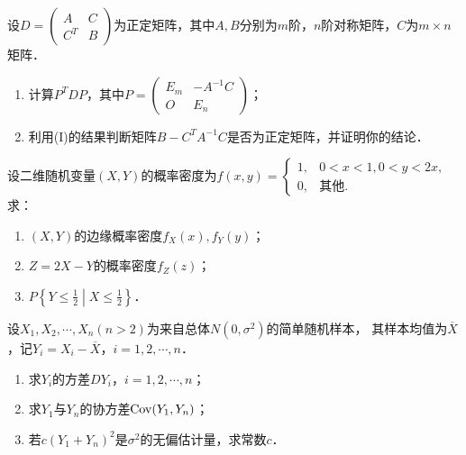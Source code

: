 \documentclass[plain,noanswer,medmath]{../../template/jnuexam}
\begin{document}
\begin{problem}[points=13]
设$D = \begin{pmatrix}
    A & C \\
  C^T & B
\end{pmatrix}$为正定矩阵，其中$A,B$分别为$m$阶，$n$阶对称矩阵，$C$为$m \times n$矩阵．
\begin{enumerate}
\item 计算$P^T DP$，其中$P = \begin{pmatrix}
  E_m & -A^{-1} C \\
    O & E_n
\end{pmatrix}$；
\item 利用(I)的结果判断矩阵$B - C^T A^{-1} C$是否为正定矩阵，并证明你的结论．
\end{enumerate}
\end{problem}


\begin{problem}[points=13]
设二维随机变量$(X,Y)$的概率密度为$f(x,y) = \begin{cases}
  1, & 0 < x < 1,0 < y < 2x, \\
  0, & \text{其他}.
\end{cases}$求：
\begin{enumerate}
\item $(X,Y)$的边缘概率密度$f_X(x),f_Y(y)$；
\item $Z = 2X - Y$的概率密度$f_Z(z)$；
\item $P\left\{Y \le \frac{1}{2} \middle| X \le \frac{1}{2} \right\}$．
\end{enumerate}
\end{problem}


\begin{problem}[points=13]
设$X_1,X_2, \cdots ,X_n(n > 2)$为来自总体$N(0,\sigma^2)$的简单随机样本，
其样本均值为$\overline{X}$，记$Y_i = X_i - \overline{X}$，$i = 1,2, \cdots ,n$．
\begin{enumerate}
\item 求$Y_i$的方差$DY_i$，$i = 1,2, \cdots ,n$；
\item 求$Y_1$与$Y_n$的协方差$\operatorname{Cov} (Y_1,Y_n)$；
\item 若$c(Y_1 + Y_n)^2$是$\sigma^2$的无偏估计量，求常数$c$．
\end{enumerate}
\end{problem}
\end{document}
